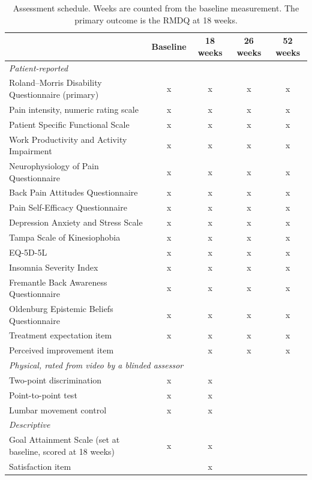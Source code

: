 \documentclass[11pt,a4paper]{article}
\begin{document}
\begin{table}[ht]
\centering\small
\caption{Assessment schedule. Weeks are counted from the baseline
measurement. The primary outcome is the RMDQ at 18 weeks.}
\label{tab:schedule}
\begin{tabular}{lcccc}
\toprule
& Baseline & 18 weeks & 26 weeks & 52 weeks\\
\midrule
\multicolumn{5}{l}{\emph{Patient-reported}}\\
Roland--Morris Disability Questionnaire (primary) & x & x & x & x\\
Pain intensity, numeric rating scale               & x & x & x & x\\
Patient Specific Functional Scale                  & x & x & x & x\\
Work Productivity and Activity Impairment          & x & x & x & x\\
Neurophysiology of Pain Questionnaire              & x & x & x & x\\
Back Pain Attitudes Questionnaire                  & x & x & x & x\\
Pain Self-Efficacy Questionnaire                   & x & x & x & x\\
Depression Anxiety and Stress Scale                & x & x & x & x\\
Tampa Scale of Kinesiophobia                       & x & x & x & x\\
EQ-5D-5L                                           & x & x & x & x\\
Insomnia Severity Index                            & x & x & x & x\\
Fremantle Back Awareness Questionnaire             & x & x & x & x\\
Oldenburg Epistemic Beliefs Questionnaire          & x & x & x & x\\
Treatment expectation item                         & x & x & x & x\\
Perceived improvement item                         &   & x & x & x\\
\midrule
\multicolumn{5}{l}{\emph{Physical, rated from video by a blinded assessor}}\\
Two-point discrimination                           & x & x &   &  \\
Point-to-point test                                & x & x &   &  \\
Lumbar movement control                            & x & x &   &  \\
\midrule
\multicolumn{5}{l}{\emph{Descriptive}}\\
Goal Attainment Scale (set at baseline, scored at 18 weeks) & x & x & & \\
Satisfaction item                                  &   & x &   &  \\
\bottomrule
\end{tabular}
\end{table}
\end{document}
